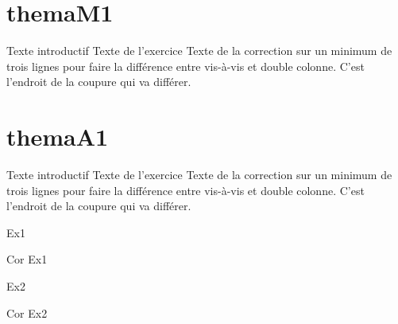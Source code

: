 \documentclass[nocrop]{sesamanuel}
\begin{document}

\themaM
\chapter{themaM1}
\cours  
\begin{methode}
  Texte introductif
  \exercice
  Texte de l’exercice
  \correction
  Texte de la correction sur un minimum de trois lignes pour faire la
  différence entre vis-à-vis et double colonne. C’est l’endroit de la
  coupure qui va différer.
\end{methode}


\themaA
\chapter{themaA1}
\cours  
\begin{methode}
  Texte introductif
  \exercice
  Texte de l’exercice
  \correction
  Texte de la correction sur un minimum de trois lignes pour faire la
  différence entre vis-à-vis et double colonne. C’est l’endroit de la
  coupure qui va différer.
\end{methode}

\begin{autoeval}  
  \begin{exercice}
    Ex1
  \end{exercice}
  \begin{corrige}
    Cor Ex1
  \end{corrige}
  \begin{exercice}
    Ex2
  \end{exercice}
  \begin{corrige}
    Cor Ex2
  \end{corrige}
\end{autoeval}

\end{document}
